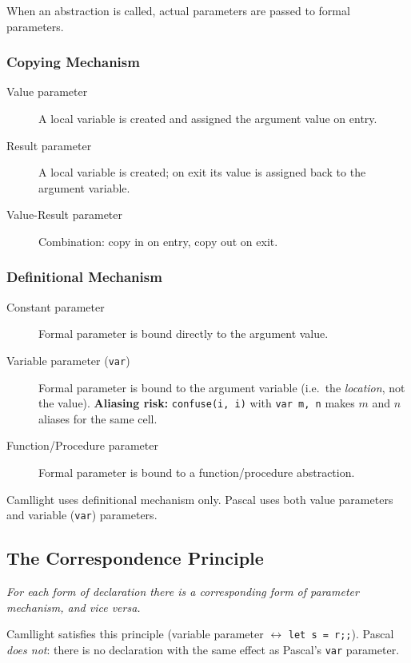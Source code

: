 \documentclass[12pt,a4paper]{article}
\begin{document}
When an abstraction is called, actual parameters are passed to formal parameters.

\subsubsection{Copying Mechanism}

\begin{description}
  \item[Value parameter] A local variable is created and assigned the argument value on entry.
  \item[Result parameter] A local variable is created; on exit its value is assigned back
        to the argument variable.
  \item[Value-Result parameter] Combination: copy in on entry, copy out on exit.
\end{description}

\subsubsection{Definitional Mechanism}

\begin{description}
  \item[Constant parameter] Formal parameter is bound directly to the argument value.
  \item[Variable parameter (\texttt{var})] Formal parameter is bound to the argument
        variable (i.e.\ the \emph{location}, not the value).
        \textbf{Aliasing risk:} \texttt{confuse(i, i)} with \texttt{var m, n} makes
        $m$ and $n$ aliases for the same cell.
  \item[Function/Procedure parameter] Formal parameter is bound to a function/procedure abstraction.
\end{description}

Camllight uses definitional mechanism only.
Pascal uses both value parameters and variable (\texttt{var}) parameters.

\subsection{The Correspondence Principle}

\textit{For each form of declaration there is a corresponding form of parameter
mechanism, and vice versa.}

Camllight satisfies this principle (variable parameter $\leftrightarrow$ \texttt{let s = r;;}).
Pascal \emph{does not}: there is no declaration with the same effect as Pascal's
\texttt{var} parameter.
\end{document}
